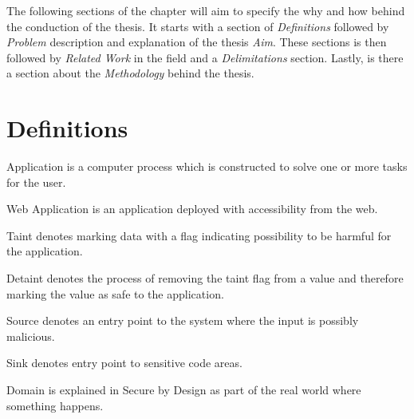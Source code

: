 The following sections of the chapter will aim to specify the why and how behind the conduction of the thesis. It starts with a section of \textit{Definitions} followed by \textit{Problem} description and explanation of the thesis \textit{Aim}. These sections is then followed by \textit{Related Work} in the field and a \textit{Delimitations} section. Lastly, is there a section about the \textit{Methodology} behind the thesis.


\section{Definitions}
\begin{definition}{Application} 
	is a computer process which is constructed to solve one or more tasks for the user.
	\\ 
\end{definition}

\begin{definition}{Web Application} 
	is an application deployed with accessibility from the web.
	\\ 
\end{definition}

\begin{definition}{Taint}
	denotes marking data with a flag indicating possibility to be harmful for the application.
	\\ 
\end{definition}

\begin{definition}{Detaint}
	denotes the process of removing the taint flag from a value and therefore marking the value as safe to the application.
	\\ 
\end{definition}

\begin{definition}{Source}
	denotes an entry point to the system where the input is possibly malicious.
	\\ 
\end{definition}

\begin{definition}{Sink}
	denotes entry point to sensitive code areas. 
	\\ 
\end{definition}

\begin{definition}{Domain}
	is explained in Secure by Design \parencite{sbd2018} as part of the real world where something happens.
	\\ 
\end{definition}

